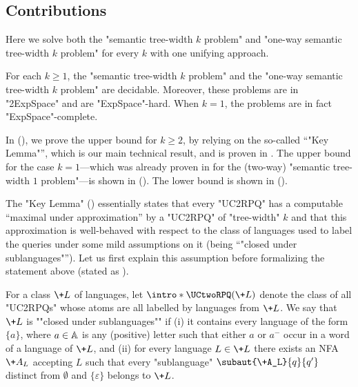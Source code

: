 \subsection{\AP{}Contributions}
Here we solve both the "semantic tree-width $k$ problem" and "one-way semantic tree-width $k$ problem" for every $k$ with one unifying approach.
\begin{theorem}
    \AP\label{thm:decidability-semtw}
    For each $k \geq 1$, the "semantic tree-width $k$ problem" and the "one-way semantic tree-width $k$ problem" are decidable. Moreover, these problems are in "2ExpSpace" and are "ExpSpace"-hard.
	When $k=1$, the problems are in fact "ExpSpace"-complete.
\end{theorem}
In  (),
we prove the upper bound for $k\geq 2$, by relying on the so-called ``"Key Lemma"'', which is our main technical result, and is proven in .
The upper bound for the case $k=1$---which was already proven in \cite{BarceloRomeroVardi2016SemanticAcyclicity} for the (two-way) "semantic tree-width $1$ problem"---is shown in  (). The lower bound is shown in  ().

The "Key Lemma" () essentially states that
every "UC2RPQ" has a computable ``maximal under approximation'' by a "UC2RPQ" of "tree-width" $k$ and that this approximation is well-behaved with respect to the class of languages used to label the queries under some mild assumptions on it (being ``"closed under sublanguages"''). Let us first
explain this assumption before formalizing the statement above (stated as ).

For a class $\+L$ of languages, let $\intro*\UCtwoRPQ(\+L)$ denote the class of all "UC2RPQs" whose atoms are all labelled by languages from $\+L$.
\AP We say that $\+L$ is ""closed under sublanguages"" if
(i) it contains every language of the form $\{a\}$,
where $a \in \mathbb{A}$ is any (positive) letter such that either $a$ or $a^-$ occur in a word of a
language of $\+L$, and (ii) for every language $L \in \+L$ there exists an NFA $\+A_L$ accepting $L$ such that every "sublanguage" $\subaut{\+A_L}{q}{q'}$ distinct from $\emptyset$ and
$\{\varepsilon\}$ belongs to $\+L$.

